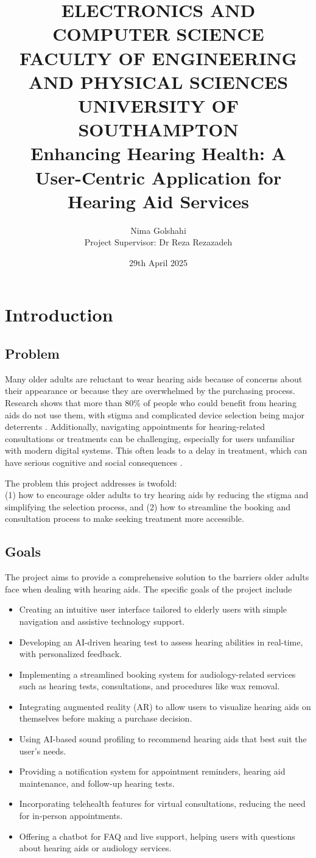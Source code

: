 \documentclass{article}
\title{%
    ELECTRONICS AND COMPUTER SCIENCE \\ 
    FACULTY OF ENGINEERING AND PHYSICAL SCIENCES \\ 
    UNIVERSITY OF SOUTHAMPTON \\ 
    \vspace{1em} %
    \textbf{Enhancing Hearing Health: A User-Centric Application for Hearing Aid Services}%
}
\author{Nima Golshahi \\ Project Supervisor: Dr Reza Rezazadeh}
\date{29th April 2025}
\begin{document}
\fancyhead[L]{} 

\section{Introduction}
\subsection{Problem}
Many older adults are reluctant to wear hearing aids because of concerns about their appearance or because they are overwhelmed by the purchasing process. Research shows that more than 80\% of people who could benefit from hearing aids do not use them, with stigma and complicated device selection being major deterrents \cite{mccormack2013}. Additionally, navigating appointments for hearing-related consultations or treatments can be challenging, especially for users unfamiliar with modern digital systems. This often leads to a delay in treatment, which can have serious cognitive and social consequences \cite{slade2020}.

The problem this project addresses is twofold: \\
(1) how to encourage older adults to try hearing aids by reducing the stigma and simplifying the selection process, and (2) how to streamline the booking and consultation process to make seeking treatment more accessible.

\subsection{Goals}
The project aims to provide a comprehensive solution to the barriers older adults face when dealing with hearing aids. The specific goals of the project include \begin{itemize} \item Creating an intuitive user interface tailored to elderly users with simple navigation and assistive technology support. \item Developing an AI-driven hearing test to assess hearing abilities in real-time, with personalized feedback. \item Implementing a streamlined booking system for audiology-related services such as hearing tests, consultations, and procedures like wax removal. \item Integrating augmented reality (AR) to allow users to visualize hearing aids on themselves before making a purchase decision. \item Using AI-based sound profiling to recommend hearing aids that best suit the user’s needs. \item Providing a notification system for appointment reminders, hearing aid maintenance, and follow-up hearing tests. \item Incorporating telehealth features for virtual consultations, reducing the need for in-person appointments. \item Offering a chatbot for FAQ and live support, helping users with questions about hearing aids or audiology services. \end{itemize}
\end{document}
